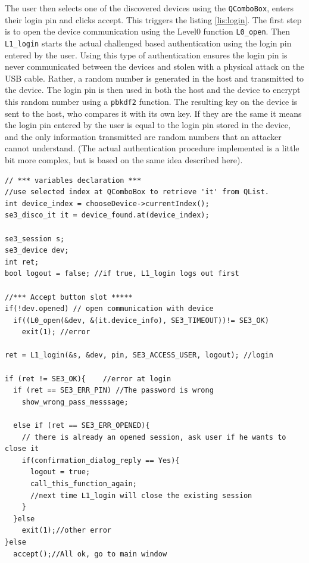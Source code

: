 The user then selects one of the discovered devices using the \texttt{QComboBox}, enters their login pin and clicks accept. This triggers the listing \ref{lis:login}. The first step is to open the device communication using the Level0 function \texttt{L0\_open}. Then \texttt{L1\_login} starts the actual challenged based authentication using the login pin entered by the user. Using this type of authentication ensures the login pin is never communicated between the devices and stolen with a physical attack on the USB cable. Rather, a random number is generated in the host and transmitted to the device. The login pin is then used in both the host and the device to encrypt this random number using a \texttt{pbkdf2} function. The resulting key on the device is sent to the host, who compares it with its own key. If they are the same it means the login pin entered by the user is equal to the login pin stored in the device, and the only information transmitted are random numbers that an attacker cannot understand. (The actual authentication procedure implemented is a little bit more complex, but is based on the same idea described here).

\begin{lstlisting}[style=customc, float=htb, caption={Open device and try to login}, label = {lis:login}]
// *** variables declaration ***
//use selected index at QComboBox to retrieve 'it' from QList.
int device_index = chooseDevice->currentIndex();
se3_disco_it it = device_found.at(device_index);

se3_session s; 
se3_device dev;
int ret;
bool logout = false; //if true, L1_login logs out first

//*** Accept button slot *****
if(!dev.opened) // open communication with device
  if((L0_open(&dev, &(it.device_info), SE3_TIMEOUT))!= SE3_OK)
    exit(1); //error

ret = L1_login(&s, &dev, pin, SE3_ACCESS_USER, logout); //login

if (ret != SE3_OK){    //error at login
  if (ret == SE3_ERR_PIN) //The password is wrong
    show_wrong_pass_messsage;
    
  else if (ret == SE3_ERR_OPENED){
    // there is already an opened session, ask user if he wants to close it
    if(confirmation_dialog_reply == Yes){ 
      logout = true; 
      call_this_function_again;
      //next time L1_login will close the existing session
    }
  }else            
    exit(1);//other error
}else
  accept();//All ok, go to main window
\end{lstlisting}

